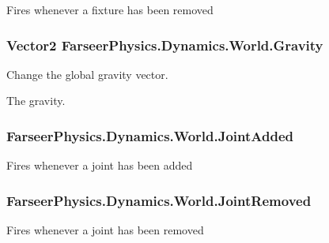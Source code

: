 Fires whenever a fixture has been removed 

\hypertarget{class_farseer_physics_1_1_dynamics_1_1_world_aed9ddcd16f6b9b7d96b332e0cdb1d6bc}{
\subsubsection[{Gravity}]{\setlength{\rightskip}{0pt plus 5cm}Vector2 Farseer\+Physics.\+Dynamics.\+World.\+Gravity}}\label{class_farseer_physics_1_1_dynamics_1_1_world_aed9ddcd16f6b9b7d96b332e0cdb1d6bc}


Change the global gravity vector. 

The gravity.\hypertarget{class_farseer_physics_1_1_dynamics_1_1_world_ae36cf4ed417ecbf95c984b0f449d765c}{
\subsubsection[{Joint\+Added}]{ Farseer\+Physics.\+Dynamics.\+World.\+Joint\+Added}}\label{class_farseer_physics_1_1_dynamics_1_1_world_ae36cf4ed417ecbf95c984b0f449d765c}


Fires whenever a joint has been added 

\hypertarget{class_farseer_physics_1_1_dynamics_1_1_world_a9427c555e5dd76cad2e4a534c87536ca}{
\subsubsection[{Joint\+Removed}]{ Farseer\+Physics.\+Dynamics.\+World.\+Joint\+Removed}}\label{class_farseer_physics_1_1_dynamics_1_1_world_a9427c555e5dd76cad2e4a534c87536ca}


Fires whenever a joint has been removed 



